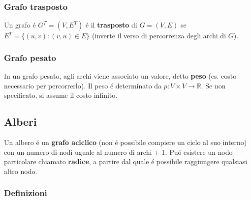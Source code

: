 \documentclass{article}
\begin{document}
\subsubsection{Grafo trasposto}
Un grafo é $G^T = (V,E^T)$ é il \textbf{trasposto} di $G = (V,E)$ se $E^T = \{(u,v):(v,u) \in E\}$ (inverte il verso di percorrenza degli archi di $G$).

\subsubsection{Grafo pesato}
In un grafo pesato, agli archi viene associato un valore, detto \textbf{peso} (es. costo necessario per percorrerlo). Il peso é determinato da $p : V \times V \to \mathbb{R}$. Se non specificato, si assume il costo infinito.

\subsection{Alberi}
Un albero é un \textbf{grafo aciclico} (non é possibile compiere un ciclo al suo interno) con un numero di nodi uguale al numero di archi + 1. Puó esistere un nodo particolare chiamato \textbf{radice}, a partire dal quale é possibile raggiungere qualsiasi altro nodo.

\subsubsection{Definizioni}
\end{document}
